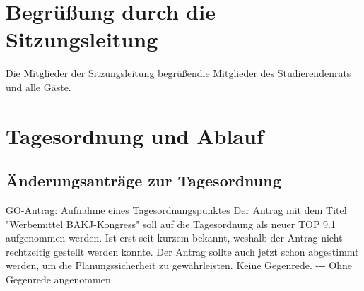 \section{Begrüßung durch die Sitzungsleitung}
Die Mitglieder  der  Sitzungsleitung begrüßendie  Mitglieder  des  Studierendenrats  und  alle Gäste.

\section{Tagesordnung und Ablauf}
\tableofcontents
\subsection{Änderungsanträge zur Tagesordnung}
\GOantrag
{
    GO-Antrag: Aufnahme eines Tagesordnungspunktes
}{
    Der Antrag mit dem Titel "Werbemittel BAKJ-Kongress" soll auf die Tagesordnung als neuer TOP 9.1 aufgenommen werden.
}{
    Ist erst seit kurzem bekannt, weshalb der Antrag nicht rechtzeitig gestellt werden konnte. Der Antrag sollte auch jetzt schon abgestimmt werden, um die Planungssicherheit zu gewährleisten.
}{
    Keine Gegenrede.
}{-}{-}{-}{
    Ohne Gegenrede angenommen.
}
